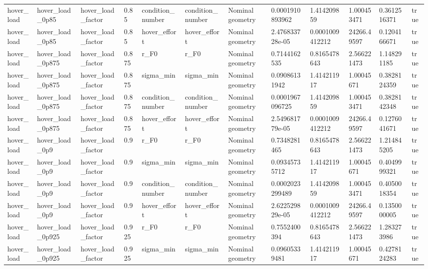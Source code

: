\begin{tabular}{@{}llllllllllll@{}}
hover\_load & hover\_load\_0p85 & hover\_load\_factor & 0.85 & condition\_number & condition\_number & Nominal geometry & 0.0001910893962 & 1.414209859 & 1.000453471 & 0.3612516371 & true \\
hover\_load & hover\_load\_0p85 & hover\_load\_factor & 0.85 & hover\_effort & hover\_effort & Nominal geometry & 2.476833728e-05 & 0.0001009412212 & 24266.49597 & 0.1204166671 & true \\
hover\_load & hover\_load\_0p875 & hover\_load\_factor & 0.875 & r\_F0 & r\_F0 & Nominal geometry & 0.7144162535 & 0.8165478643 & 2.566221473 & 1.148291185 & true \\
hover\_load & hover\_load\_0p875 & hover\_load\_factor & 0.875 & sigma\_min & sigma\_min & Nominal geometry & 0.09086131942 & 1.414211917 & 1.00045671 & 0.3828124359 & true \\
hover\_load & hover\_load\_0p875 & hover\_load\_factor & 0.875 & condition\_number & condition\_number & Nominal geometry & 0.0001967096725 & 1.414209859 & 1.000453471 & 0.3828142348 & true \\
hover\_load & hover\_load\_0p875 & hover\_load\_factor & 0.875 & hover\_effort & hover\_effort & Nominal geometry & 2.549681779e-05 & 0.0001009412212 & 24266.49597 & 0.1276041671 & true \\
hover\_load & hover\_load\_0p9 & hover\_load\_factor & 0.9 & r\_F0 & r\_F0 & Nominal geometry & 0.7348281465 & 0.8165478643 & 2.566221473 & 1.214845205 & true \\
hover\_load & hover\_load\_0p9 & hover\_load\_factor & 0.9 & sigma\_min & sigma\_min & Nominal geometry & 0.09345735712 & 1.414211917 & 1.00045671 & 0.4049999321 & true \\
hover\_load & hover\_load\_0p9 & hover\_load\_factor & 0.9 & condition\_number & condition\_number & Nominal geometry & 0.0002023299489 & 1.414209859 & 1.000453471 & 0.4050018354 & true \\
hover\_load & hover\_load\_0p9 & hover\_load\_factor & 0.9 & hover\_effort & hover\_effort & Nominal geometry & 2.622529829e-05 & 0.0001009412212 & 24266.49597 & 0.1350000005 & true \\
hover\_load & hover\_load\_0p925 & hover\_load\_factor & 0.925 & r\_F0 & r\_F0 & Nominal geometry & 0.7552400394 & 0.8165478643 & 2.566221473 & 1.283273986 & true \\
hover\_load & hover\_load\_0p925 & hover\_load\_factor & 0.925 & sigma\_min & sigma\_min & Nominal geometry & 0.09605339481 & 1.414211917 & 1.00045671 & 0.4278124283 & true \\

\end{tabular}
